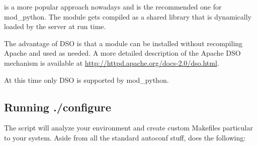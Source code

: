  is a more popular approach nowadays and is the recommended
one for mod_python. The module gets compiled as a shared library that
is dynamically loaded by the server at run time. 

The advantage of DSO is that a module can be installed without
recompiling Apache and used as needed.  A more detailed description of
the Apache DSO mechanism is available at
\url{http://httpd.apache.org/docs-2.0/dso.html}.

At this time only DSO is supported by mod_python.

\subsection{Running ./configure\label{inst-configure}}

The  script will analyze your environment and create custom
Makefiles particular to your system. Aside from all the standard
autoconf stuff,  does the following:

